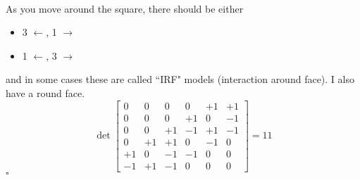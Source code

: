 \documentclass[12pt]{article}
\begin{document}
 \\
As you move around the square, there should be either
\begin{itemize}
\item 3 $\leftarrow$, 1 $\rightarrow$
\item 1 $\leftarrow$, 3 $\rightarrow$
\end{itemize}
and in some cases these are called ``IRF" models (interaction around face).  I also have a round face.
$$ \det \left[
\begin{array}{rrrrrrr}
0 & 0& 0& 0& +1& +1\\
0 & 0 & 0 & +1 & 0 & -1 \\
0 & 0 & +1 & -1 & +1 & -1 \\
0 & +1 & +1 & 0 & -1 & 0  \\
+1 & 0 & -1 & -1 & 0 & 0 \\
-1 & +1 & -1 & 0 & 0 & 0
\end{array}
 \right] = 11 $$
\hfill $\square$

\newpage

\selectfont \fontsize{12}{10}\selectfont
\end{document}
